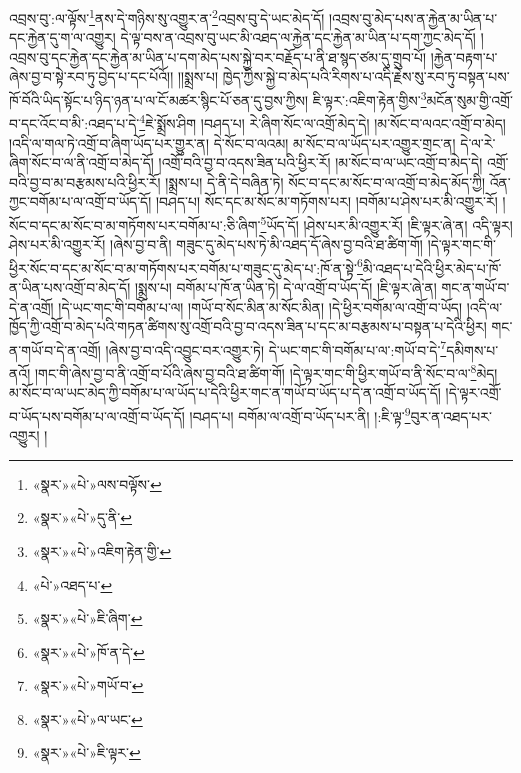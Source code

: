 འབྲས་བུ་:ལ་ལྟོས་\footnote{«སྣར་»«པེ་»ལས་བལྟོས་}ནས་དེ་གཉིས་སུ་འགྱུར་ན་\footnote{«སྣར་»«པེ་»དུ་ནི་}འབྲས་བུ་དེ་ཡང་མེད་དོ། །འབྲས་བུ་མེད་པས་ན་རྐྱེན་མ་ཡིན་པ་དང་རྐྱེན་དུ་ག་ལ་འགྱུར། དེ་ལྟ་བས་ན་འབྲས་བུ་ཡང་མི་འཐད་ལ་རྐྱེན་དང་རྐྱེན་མ་ཡིན་པ་དག་ཀྱང་མེད་དོ། །འབྲས་བུ་དང་རྐྱེན་དང་རྐྱེན་མ་ཡིན་པ་དག་མེད་པས་སྐྱེ་བར་བརྗོད་པ་ནི་ཐ་སྙད་ཙམ་དུ་གྲུབ་པོ། །རྐྱེན་བརྟག་པ་ཞེས་བྱ་བ་སྟེ་རབ་ཏུ་བྱེད་པ་དང་པོའོ།། །།སྨྲས་པ། ཁྱེད་ཀྱིས་སྐྱེ་བ་མེད་པའི་རིགས་པ་འདི་རྗེས་སུ་རབ་ཏུ་བསྟན་པས་ཁོ་བོའི་ཡིད་སྟོང་པ་ཉིད་ཉན་པ་ལ་ངོ་མཚར་སྙིང་པོ་ཅན་དུ་བྱས་ཀྱིས། ཇི་ལྟར་:འཇིག་རྟེན་གྱིས་\footnote{«སྣར་»«པེ་»འཇིག་རྟེན་གྱི་}མངོན་སུམ་གྱི་འགྲོ་བ་དང་འོང་བ་མི་:འཐད་པ་དེ་\footnote{«པེ་»འཐད་པ་}ཇེ་སྨྲོས་ཤིག །བཤད་པ། རེ་ཞིག་སོང་ལ་འགྲོ་མེད་དེ། །མ་སོང་བ་ལའང་འགྲོ་བ་མེད། །འདི་ལ་གལ་ཏེ་འགྲོ་བ་ཞིག་ཡོད་པར་གྱུར་ན། དེ་སོང་བ་ལའམ། མ་སོང་བ་ལ་ཡོད་པར་འགྱུར་གྲང་ན། དེ་ལ་རེ་ཞིག་སོང་བ་ལ་ནི་འགྲོ་བ་མེད་དོ། །འགྲོ་བའི་བྱ་བ་འདས་ཟིན་པའི་ཕྱིར་རོ། །མ་སོང་བ་ལ་ཡང་འགྲོ་བ་མེད་དེ། འགྲོ་བའི་བྱ་བ་མ་བརྩམས་པའི་ཕྱིར་རོ། །སྨྲས་པ། དེ་ནི་དེ་བཞིན་ཏེ། སོང་བ་དང་མ་སོང་བ་ལ་འགྲོ་བ་མེད་མོད་ཀྱི། འོན་ཀྱང་བགོམ་པ་ལ་འགྲོ་བ་ཡོད་དོ། །བཤད་པ། སོང་དང་མ་སོང་མ་གཏོགས་པར། །བགོམ་པ་ཤེས་པར་མི་འགྱུར་རོ། །སོང་བ་དང་མ་སོང་བ་མ་གཏོགས་པར་བགོམ་པ་:ཅི་ཞིག་\footnote{«སྣར་»«པེ་»ཇི་ཞིག་}ཡོད་དོ། །ཤེས་པར་མི་འགྱུར་རོ། །ཇི་ལྟར་ཞེ་ན། འདི་ལྟར། ཤེས་པར་མི་འགྱུར་རོ། །ཞེས་བྱ་བ་ནི། གཟུང་དུ་མེད་པས་ཏེ་མི་འཐད་དོ་ཞེས་བྱ་བའི་ཐ་ཚིག་གོ། །དེ་ལྟར་གང་གི་ཕྱིར་སོང་བ་དང་མ་སོང་བ་མ་གཏོགས་པར་བགོམ་པ་གཟུང་དུ་མེད་པ་:ཁོ་ན་སྟེ་\footnote{«སྣར་»«པེ་»ཁོ་ན་དེ་}མི་འཐད་པ་དེའི་ཕྱིར་མེད་པ་ཁོ་ན་ཡིན་པས་འགྲོ་བ་མེད་དོ། །སྨྲས་པ། བགོམ་པ་ཁོ་ན་ཡིན་ཏེ། དེ་ལ་འགྲོ་བ་ཡོད་དོ། །ཇི་ལྟར་ཞེ་ན། གང་ན་གཡོ་བ་དེ་ན་འགྲོ། །དེ་ཡང་གང་གི་བགོམ་པ་ལ། །གཡོ་བ་སོང་མིན་མ་སོང་མིན། །དེ་ཕྱིར་བགོམ་ལ་འགྲོ་བ་ཡོད། །འདི་ལ་ཁྱོད་ཀྱི་འགྲོ་བ་མེད་པའི་གཏན་ཚིགས་སུ་འགྲོ་བའི་བྱ་བ་འདས་ཟིན་པ་དང་མ་བརྩམས་པ་བསྟན་པ་དེའི་ཕྱིར། གང་ན་གཡོ་བ་དེ་ན་འགྲོ། །ཞེས་བྱ་བ་འདི་འབྱུང་བར་འགྱུར་ཏེ། དེ་ཡང་གང་གི་བགོམ་པ་ལ་:གཡོ་བ་དེ་\footnote{«སྣར་»«པེ་»གཡོ་བ་}དམིགས་པ་ནའོ། །གང་གི་ཞེས་བྱ་བ་ནི་འགྲོ་བ་པོའི་ཞེས་བྱ་བའི་ཐ་ཚིག་གོ། །དེ་ལྟར་གང་གི་ཕྱིར་གཡོ་བ་ནི་སོང་བ་ལ་\footnote{«སྣར་»«པེ་»ལ་ཡང་}མེད། མ་སོང་བ་ལ་ཡང་མེད་ཀྱི་བགོམ་པ་ལ་ཡོད་པ་དེའི་ཕྱིར་གང་ན་གཡོ་བ་ཡོད་པ་དེ་ན་འགྲོ་བ་ཡོད་དོ། །དེ་ལྟར་འགྲོ་བ་ཡོད་པས་བགོམ་པ་ལ་འགྲོ་བ་ཡོད་དོ། །བཤད་པ། བགོམ་ལ་འགྲོ་བ་ཡོད་པར་ནི། །:ཇི་ལྟ་\footnote{«སྣར་»«པེ་»ཇི་ལྟར་}བུར་ན་འཐད་པར་འགྱུར། །
